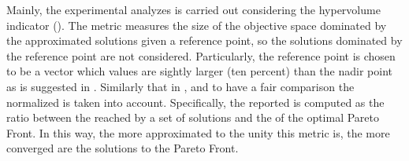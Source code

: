 %
%
%
%
%
%
%


Mainly, the experimental analyzes is carried out considering the hypervolume indicator (\HV{}).
%
The \HV{} metric measures the size of the objective space dominated by the approximated solutions given a reference point, so the solutions dominated by the reference point are not considered.
%
Particularly, the reference point is chosen to be a vector which values are sightly larger (ten percent) than the nadir point as is suggested in \cite{ishibuchi2017reference}.
%
Similarly that in \cite{li2015evolutionary}, and to have a fair comparison the normalized \HV{} is taken into account.
%
Specifically, the \HV{} reported is computed as the ratio between the \HV{} reached by a set of solutions and the \HV{} of the optimal Pareto Front.
%
In this way, the more approximated to the unity this metric is, the more converged are the solutions to the Pareto Front.
%



